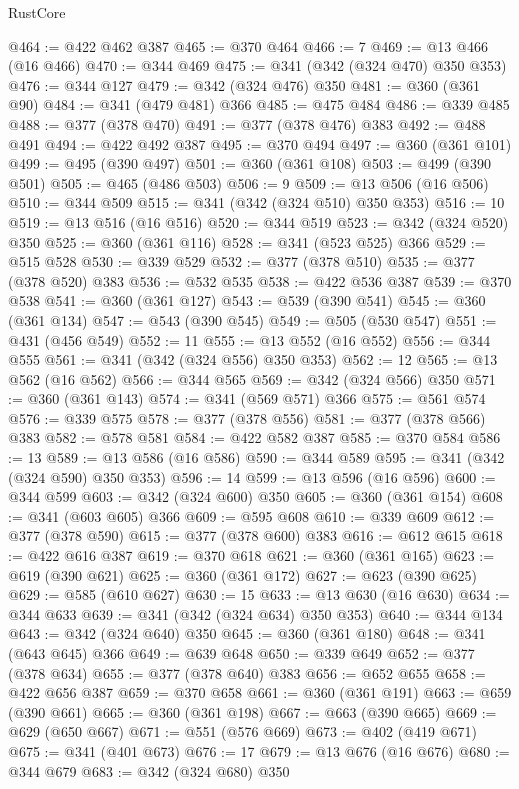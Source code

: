 \begin{lexlean}{RustCore}
\begin{coremodule}
@464 := @422 @462 @387
@465 := @370 @464
@466 := 7
@469 := @13 @466 (@16 @466)
@470 := @344 @469
@475 := @341 (@342 (@324 @470) @350 @353)
@476 := @344 @127
@479 := @342 (@324 @476) @350
@481 := @360 (@361 @90)
@484 := @341 (@479 @481) @366
@485 := @475 @484
@486 := @339 @485
@488 := @377 (@378 @470)
@491 := @377 (@378 @476) @383
@492 := @488 @491
@494 := @422 @492 @387
@495 := @370 @494
@497 := @360 (@361 @101)
@499 := @495 (@390 @497)
@501 := @360 (@361 @108)
@503 := @499 (@390 @501)
@505 := @465 (@486 @503)
@506 := 9
@509 := @13 @506 (@16 @506)
@510 := @344 @509
@515 := @341 (@342 (@324 @510) @350 @353)
@516 := 10
@519 := @13 @516 (@16 @516)
@520 := @344 @519
@523 := @342 (@324 @520) @350
@525 := @360 (@361 @116)
@528 := @341 (@523 @525) @366
@529 := @515 @528
@530 := @339 @529
@532 := @377 (@378 @510)
@535 := @377 (@378 @520) @383
@536 := @532 @535
@538 := @422 @536 @387
@539 := @370 @538
@541 := @360 (@361 @127)
@543 := @539 (@390 @541)
@545 := @360 (@361 @134)
@547 := @543 (@390 @545)
@549 := @505 (@530 @547)
@551 := @431 (@456 @549)
@552 := 11
@555 := @13 @552 (@16 @552)
@556 := @344 @555
@561 := @341 (@342 (@324 @556) @350 @353)
@562 := 12
@565 := @13 @562 (@16 @562)
@566 := @344 @565
@569 := @342 (@324 @566) @350
@571 := @360 (@361 @143)
@574 := @341 (@569 @571) @366
@575 := @561 @574
@576 := @339 @575
@578 := @377 (@378 @556)
@581 := @377 (@378 @566) @383
@582 := @578 @581
@584 := @422 @582 @387
@585 := @370 @584
@586 := 13
@589 := @13 @586 (@16 @586)
@590 := @344 @589
@595 := @341 (@342 (@324 @590) @350 @353)
@596 := 14
@599 := @13 @596 (@16 @596)
@600 := @344 @599
@603 := @342 (@324 @600) @350
@605 := @360 (@361 @154)
@608 := @341 (@603 @605) @366
@609 := @595 @608
@610 := @339 @609
@612 := @377 (@378 @590)
@615 := @377 (@378 @600) @383
@616 := @612 @615
@618 := @422 @616 @387
@619 := @370 @618
@621 := @360 (@361 @165)
@623 := @619 (@390 @621)
@625 := @360 (@361 @172)
@627 := @623 (@390 @625)
@629 := @585 (@610 @627)
@630 := 15
@633 := @13 @630 (@16 @630)
@634 := @344 @633
@639 := @341 (@342 (@324 @634) @350 @353)
@640 := @344 @134
@643 := @342 (@324 @640) @350
@645 := @360 (@361 @180)
@648 := @341 (@643 @645) @366
@649 := @639 @648
@650 := @339 @649
@652 := @377 (@378 @634)
@655 := @377 (@378 @640) @383
@656 := @652 @655
@658 := @422 @656 @387
@659 := @370 @658
@661 := @360 (@361 @191)
@663 := @659 (@390 @661)
@665 := @360 (@361 @198)
@667 := @663 (@390 @665)
@669 := @629 (@650 @667)
@671 := @551 (@576 @669)
@673 := @402 (@419 @671)
@675 := @341 (@401 @673)
@676 := 17
@679 := @13 @676 (@16 @676)
@680 := @344 @679
@683 := @342 (@324 @680) @350

\end{coremodule}
\end{lexlean}
